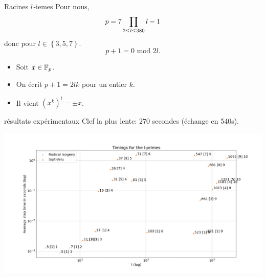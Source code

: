 \documentclass{beamer}
\begin{document}
\begin{frame}[noframenumbering]{Racines $\mathnormal{l}$-iemes}
	Pour nous,
	\[
		p = 7\prod_{2\leq \mathnormal{l}\leq 380} \mathnormal{l} - 1
	\]
	donc pour $l\in\left\{3, 5, 7\right\}$.
	\[
		p + 1 = 0 \text{ mod }  2l.
	\]
	\begin{itemize}
		\item Soit $x\in\mathbb{F}_p$.
		\item On \'ecrit $p+1 = 2lk$ pour un entier $k$.
		\item Il vient $(x^k)^l = \pm x$.
	\end{itemize}
\end{frame}

\begin{frame}{résultats expérimentaux}
	Clef la plus lente: $270$ secondes (\'echange en 540s).
	\begin{center}
		\includegraphics[scale=0.22]{../figs/timings}
	\end{center}
\end{frame}
\end{document}
